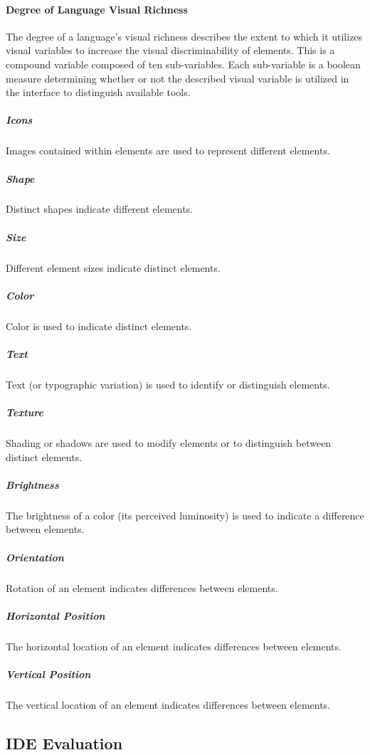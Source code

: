\paragraph{Degree of Language Visual Richness} The degree of a language's
visual richness describes the extent to which it utilizes visual
variables to increase the visual discriminability of elements. This
is a compound variable composed of ten sub-variables. Each sub-variable
is a boolean measure determining whether or not the described visual
variable is utilized in the interface to distinguish available tools.

\subparagraph{Icons} Images contained within elements are used to represent
different elements. \cite{costagliola2002,moody2009}

\subparagraph{Shape} Distinct shapes indicate different elements.
\cite{moody2009}

\subparagraph{Size} Different element sizes indicate distinct elements.
\cite{moody2009}

\subparagraph{Color} Color is used to indicate distinct elements.
\cite{moody2009}

\subparagraph{Text} Text (or typographic variation) is used to identify or
distinguish elements. \cite{moody2009}

\subparagraph{Texture} Shading or shadows are used to modify elements or to
distinguish between distinct elements. \cite{moody2009}

\subparagraph{Brightness} The brightness of a color (\ie its perceived
luminosity) is used to indicate a difference between elements.
\cite{moody2009}

\subparagraph{Orientation} Rotation of an element indicates differences
between elements. \cite{moody2009}

\subparagraph{Horizontal Position} The horizontal location of an element
indicates differences between elements. \cite{moody2009}

\subparagraph{Vertical Position} The vertical location of an element
indicates differences between elements. \cite{moody2009}


\subsection{IDE Evaluation} \label{subsec:ideevaluation}
